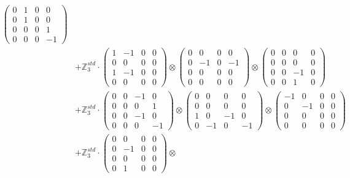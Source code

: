 \documentclass{article}
\begin{document}
{\begin{align}
            \begin{pmatrix} 0 & 1 & 0 & 0 \\ 0 & 1 & 0 & 0 \\ 0 & 0 & 0 & 1 \\ 0 & 0 & 0 & -1 \end{pmatrix} \\ 
        &+ \label{Rs1-Rc16-Solution-3-c15} \mathbb{Z}_3^{std} \cdot 
            \begin{pmatrix} 1 & -1 & 0 & 0 \\ 0 & 0 & 0 & 0 \\ 1 & -1 & 0 & 0 \\ 0 & 0 & 0 & 0 \end{pmatrix} \otimes 
            \begin{pmatrix} 0 & 0 & 0 & 0 \\ 0 & -1 & 0 & -1 \\ 0 & 0 & 0 & 0 \\ 0 & 0 & 0 & 0 \end{pmatrix} \otimes 
            \begin{pmatrix} 0 & 0 & 0 & 0 \\ 0 & 0 & 0 & 0 \\ 0 & 0 & -1 & 0 \\ 0 & 0 & 1 & 0 \end{pmatrix} \\ 
        &+ \label{Rs1-Rc16-Solution-3-c16} \mathbb{Z}_3^{std} \cdot 
            \begin{pmatrix} 0 & 0 & -1 & 0 \\ 0 & 0 & 0 & 1 \\ 0 & 0 & -1 & 0 \\ 0 & 0 & 0 & -1 \end{pmatrix} \otimes 
            \begin{pmatrix} 0 & 0 & 0 & 0 \\ 0 & 0 & 0 & 0 \\ 1 & 0 & -1 & 0 \\ 0 & -1 & 0 & -1 \end{pmatrix} \otimes 
            \begin{pmatrix} -1 & 0 & 0 & 0 \\ 0 & -1 & 0 & 0 \\ 0 & 0 & 0 & 0 \\ 0 & 0 & 0 & 0 \end{pmatrix} \\ 
        &+ \label{Rs1-Rc16-Solution-3-c17} \mathbb{Z}_3^{std} \cdot 
            \begin{pmatrix} 0 & 0 & 0 & 0 \\ 0 & -1 & 0 & 0 \\ 0 & 0 & 0 & 0 \\ 0 & 1 & 0 & 0 \end{pmatrix} \otimes 

\end{align}}
\end{document}

